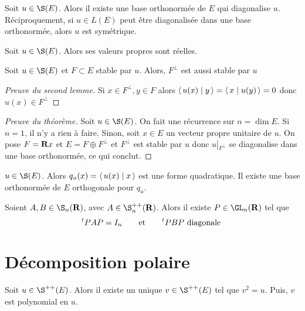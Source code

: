 \begin{thm}
    Soit $u \in  \S(E)$. Alors il existe une base orthonormée de $E$ qui diagonalise  $u$. Réciproquement, si  $u \in  L(E)$ peut être diagonalisée dans une base orthonormée, alors  $u$ est symétrique.
\end{thm}

\begin{lmm}
    Soit $u \in  \S(E)$. Alors ses valeurs propres sont réelles.
\end{lmm}

\begin{lmm}
    Soit $u \in  \S(E)$ et $F\subset E$ stable par  $u$. Alors,  $F^\bot$ est aussi stable par  $u$
\end{lmm}

\begin{proof}[Preuve du second lemme]
    Si $x \in  F^\bot, y \in  F$ alors $ \scalar{u(x)}{y}= \scalar{x}{u(y)}=0  $ donc $u(x)\in F^\bot$
\end{proof}

\begin{proof}[Preuve du théorème]
    Soit $u \in  \S(E)$. On fait une récurrence sur $n=\dim E$. Si  $n=1$, il n'y a rien à faire. Sinon, soit  $x\in  E$ un vecteur propre unitaire de $u$. On pose $F=\mathbf R x$ et $E=F\oplus F^\bot$ et  $F^\bot$ est stable par  $u$ donc  $u\left|_{F^\bot}\right.$ se diagonalise dans une base orthonormée, ce qui conclut.
\end{proof}


\begin{cor}
    $u \in  \S(E)$. Alors $q_u(x)= \scalar{u(x)}{x} $ est une forme quadratique. Il existe une base orthonormée de $E$ orthogonale pour $q_u$.
\end{cor}

\begin{cor}
    Soient $A, B \in  \S_n(\R)$, avec $A \in  \S_n^{++}(\R)$. Alors il existe $P \in  \GL_n(\R)$ tel que \[
        {}^t PAP=I_n \qquad \text{et}\qquad  {}^t PBP\text{ diagonale }
    \]
\end{cor}


\section{Décomposition polaire}

\begin{prop}
    Soit $u \in  \S^{++}(E)$. Alors il existe un unique $v \in  \S ^{++}(E)$ tel que $v^2 =u$. Puis, $v$ est polynomial en  $u$.
\end{prop}

